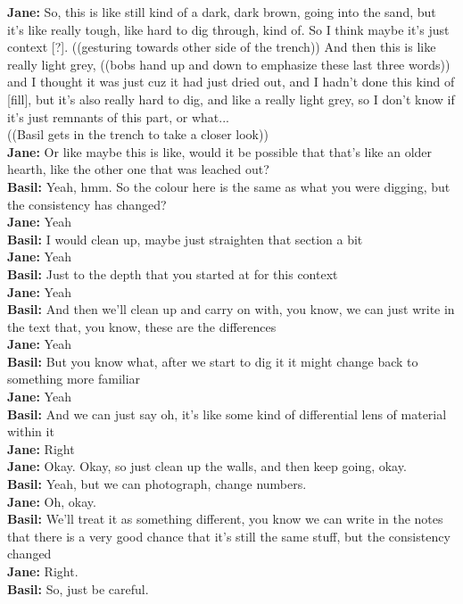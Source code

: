 \begin{arefs}
\item\label{A2}
\textbf{Jane:} So, this is like still kind of a dark, dark brown, going into the sand, but it's like really tough, like hard to dig through, kind of. So I think maybe it's just context [?]. ((gesturing towards other side of the trench)) And then this is like really light grey, ((bobs hand up and down to emphasize these last three words)) and I thought it was just cuz it had just dried out, and I hadn't done this kind of [fill], but it's also really hard to dig, and like a really light grey, so I don't know if it's just remnants of this part, or what...\\
((Basil gets in the trench to take a closer look))\\
\textbf{Jane:} Or like maybe this is like, would it be possible that that's like an older hearth, like the other one that was leached out?\\
\textbf{Basil:} Yeah, hmm. So the colour here is the same as what you were digging, but the consistency has changed?\\
\textbf{Jane:} Yeah\\
\textbf{Basil:} I would clean up, maybe just straighten that section a bit\\
\textbf{Jane:} Yeah\\
\textbf{Basil:} Just to the depth that you started at for this context\\
\textbf{Jane:} Yeah\\
\textbf{Basil:} And then we'll clean up and carry on with, you know, we can just write in the text that, you know, these are the differences\\
\textbf{Jane:} Yeah\\
\textbf{Basil:} But you know what, after we start to dig it it might change back to something more familiar\\
\textbf{Jane:} Yeah\\
\textbf{Basil:} And we can just say oh, it's like some kind of differential lens of material within it\\
\textbf{Jane:} Right\\
\textbf{Jane:} Okay. Okay, so just clean up the walls, and then keep going, okay.\\
\textbf{Basil:} Yeah, but we can photograph, change numbers.\\
\textbf{Jane:} Oh, okay.\\
\textbf{Basil:} We'll treat it as something different, you know we can write in the notes that there is a very good chance that it's still the same stuff, but the consistency changed\\
\textbf{Jane:} Right.\\
\textbf{Basil:} So, just be careful.


\end{arefs}
